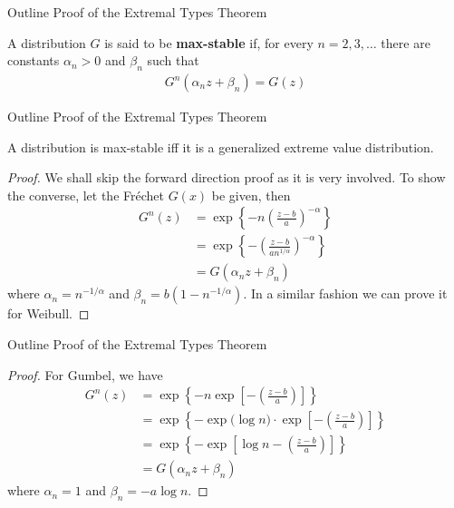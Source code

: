\documentclass[10pt]{beamer}
\begin{document}
\begin{frame}{Outline Proof of the Extremal Types Theorem}
\begin{definition}
A distribution $G$ is said to be \textbf{max-stable} if, for every $n=2,3,\ldots$ there are constants $\alpha_n>0$ and $\beta_n$ such that
\begin{align*}
G^n(\alpha_nz+\beta_n) = G(z)
\end{align*}
\end{definition}
\end{frame}

\begin{frame}{Outline Proof of the Extremal Types Theorem}
\begin{theorem}\label{thm:maxstablegev}
A distribution is max-stable iff it is a generalized extreme value distribution.
\begin{proof}
We shall skip the forward direction proof as it is very involved. To show the converse, let the Fr\'echet $G(x)$ be given, then 	
\begin{align*}
G^n(z) &= \exp\left\{-n\left(\frac{z-b}{a}\right)^{-\alpha}\right\}\\
&= \exp\left\{-\left(\frac{z-b}{an^{1/\alpha}}\right)^{-\alpha}\right\}\\
&=G(\alpha_nz+\beta_n)
\end{align*}
where $\alpha_n = n^{-1/\alpha}$ and $\beta_n = b(1 - n^{-1/\alpha})$. In a similar fashion we can prove it for Weibull. 
\end{proof}
\end{theorem}
\end{frame}

\begin{frame}{Outline Proof of the Extremal Types Theorem}
\begin{proof}
For Gumbel, we have
\begin{align*}
G^n(z) &= \exp\left\{-n\exp\left[-\left(\frac{z-b}{a}\right)\right]\right\} \\
&= \exp\left\{-\exp\Big(\log n\Big)\cdot\exp\left[-\left(\frac{z-b}{a}\right)\right]\right\}\\
&= \exp\left\{-\exp\left[\log n-\left(\frac{z-b}{a}\right)\right]\right\} \\
&=G(\alpha_nz+\beta_n)
\end{align*}
where $\alpha_n = 1$ and $\beta_n = -a\log n$.
\end{proof}
\end{frame}
\end{document}
